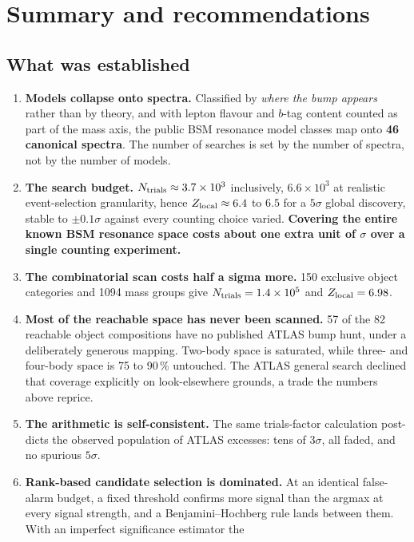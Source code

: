 \section{Summary and recommendations}
\label{sec:summary}

\subsection{What was established}

\begin{enumerate}[leftmargin=1.6em,itemsep=4pt]
  \item \textbf{Models collapse onto spectra.} Classified by \emph{where the bump appears} rather
than by theory, and with lepton flavour and $b$-tag content counted as part of the mass axis, the
public BSM resonance model classes map onto \textbf{46 canonical spectra}. The number of searches is
set by the number of spectra, not by the number of models.
  \item \textbf{The search budget.} $N_{\mathrm{trials}} \approx 3.7\times10^{3}$ inclusively,
        $6.6\times10^{3}$ at realistic event-selection granularity, hence $Z_{\mathrm{local}} \approx 6.4$ to
$6.5$ for a $5\sigma$ global discovery, stable to $\pm0.1\sigma$ against every counting choice
varied. \textbf{Covering the entire known BSM resonance space costs about one extra unit of $\sigma$
over a single counting experiment.}
  \item \textbf{The combinatorial scan costs half a sigma more.} 150 exclusive object categories
        and 1094 mass groups give $N_{\mathrm{trials}} = 1.4\times10^{5}$ and $Z_{\mathrm{local}} = 6.98$.
  \item \textbf{Most of the reachable space has never been scanned.} 57 of the 82 reachable object
compositions have no published ATLAS bump hunt, under a deliberately generous mapping. Two-body
space is saturated, while three- and four-body space is 75 to 90\,\% untouched. The ATLAS general
search declined that coverage explicitly on look-elsewhere grounds, a trade the numbers above
reprice.
  \item \textbf{The arithmetic is self-consistent.} The same trials-factor calculation post-dicts
        the observed population of ATLAS excesses: tens of $3\sigma$, all faded, and no spurious
        $5\sigma$.
  \item \textbf{Rank-based candidate selection is dominated.} At an identical false-alarm budget, a
        fixed threshold confirms more signal than the argmax at every signal strength, and a
        Benjamini--Hochberg rule lands between them. With an imperfect significance estimator the

\end{enumerate}

